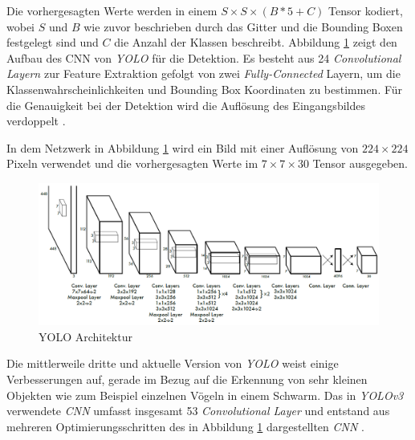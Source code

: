 \newpage

Die vorhergesagten Werte werden in einem $S \times S \times (B * 5 + C)$ Tensor kodiert, wobei $S$ und $B$ wie zuvor beschrieben durch das Gitter und die Bounding Boxen festgelegt sind und $C$ die Anzahl der Klassen beschreibt. Abbildung \ref{yolo_architecture} zeigt den Aufbau des CNN von \textit{YOLO} für die Detektion. Es besteht aus 24 \textit{Convolutional Layern} zur Feature Extraktion gefolgt von zwei \textit{Fully-Connected} Layern, um die Klassenwahrscheinlichkeiten und Bounding Box Koordinaten zu bestimmen. Für die Genauigkeit bei der Detektion wird die Auflösung des Eingangsbildes verdoppelt \cite{JosephRedmon.2016}. 

In dem Netzwerk in Abbildung \ref{yolo_architecture} wird ein Bild mit einer Auflösung von $224 \times 224$ Pixeln verwendet und die vorhergesagten Werte im $7 \times 7 \times 30$ Tensor ausgegeben.

\begin{figure}[ht]
	\begin{center}
		\includegraphics[width=15cm]{Bilder/yolo_architecture.png} 
		\caption[YOLO Architektur]{YOLO Architektur \cite{JosephRedmon.2016}}
		\label{yolo_architecture}
	\end{center}
\end{figure}

Die mittlerweile dritte und aktuelle Version von \textit{YOLO} weist einige Verbesserungen auf, gerade im Bezug auf die Erkennung von sehr kleinen Objekten wie zum Beispiel einzelnen Vögeln in einem Schwarm. Das in \textit{YOLOv3} verwendete \textit{CNN} umfasst insgesamt 53 \textit{Convolutional Layer} und entstand aus mehreren Optimierungsschritten des in Abbildung \ref{yolo_architecture} dargestellten \textit{CNN} \cite{JosephRedmon.2018}. 





